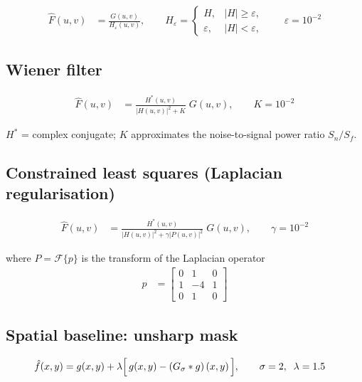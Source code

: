 \documentclass[11pt]{article}
\begin{document}
\begin{align}
  \hat{F}(u,v) &= \frac{G(u,v)}{H_{\varepsilon}(u,v)},
  \qquad
  H_{\varepsilon} =
  \begin{cases}
    H,          & |H| \ge \varepsilon, \\
    \varepsilon, & |H| < \varepsilon,
  \end{cases}
  \qquad \varepsilon = 10^{-2}
\end{align}

\subsection*{Wiener filter}

\begin{align}
  \hat{F}(u,v) &= \frac{H^{*}(u,v)}{\left|H(u,v)\right|^{2} + K}\;G(u,v),
  \qquad K = 10^{-2}
\end{align}

\noindent $H^{*}$ = complex conjugate; $K$ approximates the noise-to-signal power ratio
$S_{n}/S_{f}$.

\subsection*{Constrained least squares (Laplacian regularisation)}

\begin{align}
  \hat{F}(u,v) &= \frac{H^{*}(u,v)}
                       {\left|H(u,v)\right|^{2} + \gamma\left|P(u,v)\right|^{2}}\;G(u,v),
  \qquad \gamma = 10^{-2}
\end{align}

\noindent where $P = \mathcal{F}\{p\}$ is the transform of the Laplacian operator
\begin{align}
  p &=
  \begin{bmatrix}
    0 & 1 & 0 \\
    1 & -4 & 1 \\
    0 & 1 & 0
  \end{bmatrix}
\end{align}

\subsection*{Spatial baseline: unsharp mask}

\begin{align}
  \hat{f}(x,y) &= g(x,y) + \lambda\Bigl[\,g(x,y) - \left(G_{\sigma} * g\right)(x,y)\,\Bigr],
  \qquad \sigma = 2, \;\; \lambda = 1.5
\end{align}
\end{document}
